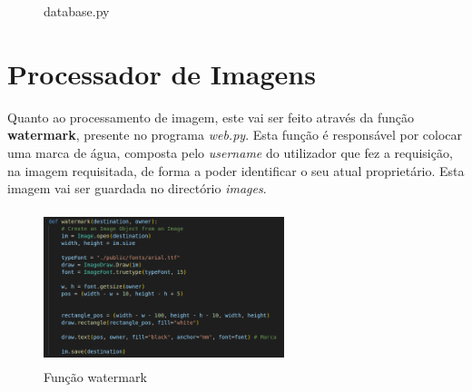 \documentclass{report}
\begin{document}
\begin{figure}[H]%
    \centering
    \qquad
    \caption{database.py}%
    \label{fig:databaseimg}%
\end{figure}

\section{Processador de Imagens}
\label{sec.procimagem}

Quanto ao processamento de imagem, este vai ser feito através da função \textbf{watermark}, presente no programa \textit{web.py}. Esta função é responsável por colocar uma marca de água, composta pelo \textit{username} do utilizador que fez a requisição, na imagem requisitada, de forma a poder identificar o seu atual proprietário. Esta imagem vai ser guardada no directório \textit{images}. 

\begin{figure}[H]
	\centering
	\includegraphics[height=4.5cm, width=7cm]{images/funcaowatermark.png}
	\caption{Função watermark}
	\label{fig.funcaowatermark}
\end{figure}
\end{document}
